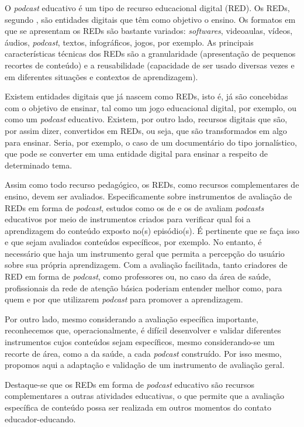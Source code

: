 O \textit{podcast} educativo é um tipo de recurso educacional digital (RED). Os REDs, segundo \textcite{araujo2019}, são entidades digitais que têm como objetivo o ensino. Os formatos em que se apresentam os REDs são bastante variados: \textit{softwares}, videoaulas, vídeos, áudios, \textit{podcast}, textos, infográficos, jogos, por exemplo. As principais características técnicas dos REDs são a granularidade (apresentação de pequenos recortes de conteúdo) e a reusabilidade (capacidade de ser usado diversas vezes e em diferentes situações e contextos de aprendizagem). 

Existem entidades digitais que já nascem como REDs, isto é, já são concebidas com o objetivo de ensinar, tal como um jogo educacional digital, por exemplo, ou como um \textit{podcast} educativo. Existem, por outro lado, recursos digitais que são, por assim dizer, convertidos em REDs, ou seja, que são transformados em algo para ensinar. Seria, por exemplo, o caso de um documentário do tipo jornalístico, que pode se converter em uma entidade digital para ensinar a respeito de determinado tema.

Assim como todo recurso pedagógico, os REDs, como recursos complementares de ensino, devem ser avaliados. Especificamente sobre instrumentos de avaliação de REDs em forma de \textit{podcast}, estudos como os de \textcite{semakula2017,semakula2020} e os de \textcite{sulistiawati2022} avaliam \textit{podcasts} educativos por meio de instrumentos criados para verificar qual foi a aprendizagem do conteúdo exposto no(s) episódio(s). É pertinente que se faça isso e que sejam avaliados conteúdos específicos, por exemplo.  No entanto, é necessário que haja um instrumento geral que permita a percepção do usuário sobre sua própria aprendizagem. Com a avaliação facilitada, tanto criadores de RED em forma de \textit{podcast}, como professores ou, no caso da área de saúde, profissionais da rede de atenção básica poderiam entender melhor como, para quem e por que utilizarem \textit{podcast} para promover a aprendizagem.

Por outro lado, mesmo considerando a avaliação específica importante, reconhecemos que, operacionalmente, é difícil desenvolver e validar diferentes instrumentos cujos conteúdos sejam específicos, mesmo considerando-se um recorte de área, como a da saúde, a cada \textit{podcast} construído. Por isso mesmo, propomos aqui a  adaptação e validação de um instrumento de avaliação geral. 

Destaque-se que os REDs em forma de \textit{podcast} educativo são recursos complementares a outras atividades educativas, o que permite que a avaliação específica de conteúdo possa ser realizada em outros momentos do contato educador-educando.

